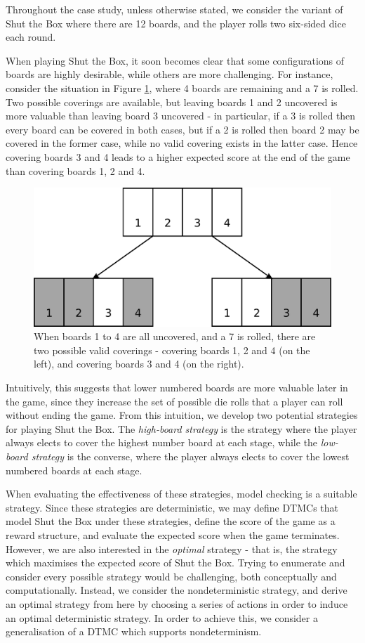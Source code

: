 Throughout the case study, unless otherwise stated, we consider the variant of Shut the Box where there are 12 boards, and the player rolls two six-sided dice each round.

When playing Shut the Box, it soon becomes clear that some configurations of boards are highly desirable, while others are more challenging. For instance, consider the situation in Figure \ref{cs1:cover_choice}, where 4 boards are remaining and a 7 is rolled. Two possible coverings are available, but leaving boards 1 and 2 uncovered is more valuable than leaving board 3 uncovered - in particular, if a 3 is rolled then every board can be covered in both cases, but if a 2 is rolled then board 2 may be covered in the former case, while no valid covering exists in the latter case. Hence covering boards 3 and 4 leads to a higher expected score at the end of the game than covering boards 1, 2 and 4.

\begin{figure}
    \centering
    \includegraphics[width=0.5\linewidth]{images/cover_choice.pdf}
    \caption{When boards 1 to 4 are all uncovered, and a 7 is rolled, there are two possible valid coverings - covering boards 1, 2 and 4 (on the left), and covering boards 3 and 4 (on the right).}
    \label{cs1:cover_choice}
\end{figure}

Intuitively, this suggests that lower numbered boards are more valuable later in the game, since they increase the set of possible die rolls that a player can roll without ending the game. From this intuition, we develop two potential strategies for playing Shut the Box. The \emph{high-board strategy} is the strategy where the player always elects to cover the highest number board at each stage, while the \emph{low-board strategy} is the converse, where the player always elects to cover the lowest numbered boards at each stage.

When evaluating the effectiveness of these strategies, model checking is a suitable strategy. Since these strategies are deterministic, we may define DTMCs that model Shut the Box under these strategies, define the score of the game as a reward structure, and evaluate the expected score when the game terminates. However, we are also interested in the \emph{optimal} strategy - that is, the strategy which maximises the expected score of Shut the Box. Trying to enumerate and consider every possible strategy would be challenging, both conceptually and computationally. Instead, we consider the nondeterministic strategy, and derive an optimal strategy from here by choosing a series of actions in order to induce an optimal deterministic strategy. In order to achieve this, we consider a generalisation of a DTMC which supports nondeterminism.

